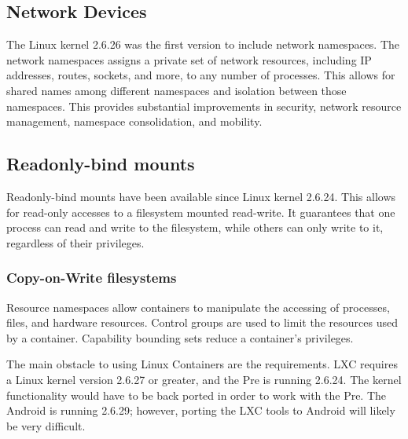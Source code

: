 \subsection{Network Devices}The Linux kernel 2.6.26 was the first version to include network namespaces.  The network namespaces assigns a private set of network resources, including IP addresses, routes, sockets, and more, to any number of processes.  This allows for shared names among different namespaces and isolation between those namespaces.  This provides substantial improvements in security, network resource management, namespace consolidation, and mobility.


\subsection{Readonly-bind mounts}
Readonly-bind mounts have been available since Linux kernel 2.6.24.  This allows for read-only accesses to a filesystem mounted read-write.  It guarantees that one process can read and write to the filesystem, while others can only write to it, regardless of their privileges.

\subsubsection{Copy-on-Write filesystems}

Resource namespaces allow containers to manipulate the accessing of processes, files, and hardware resources.  Control groups are used to limit the resources used by a container.  Capability bounding sets reduce a container's privileges.  

The main obstacle to using Linux Containers are the requirements.  LXC requires a Linux kernel version 2.6.27 or greater, and the Pre is running 2.6.24.  The kernel functionality would have to be back ported in order to work with the Pre.  The Android is running 2.6.29; however, porting the LXC tools to Android will likely be very difficult.
